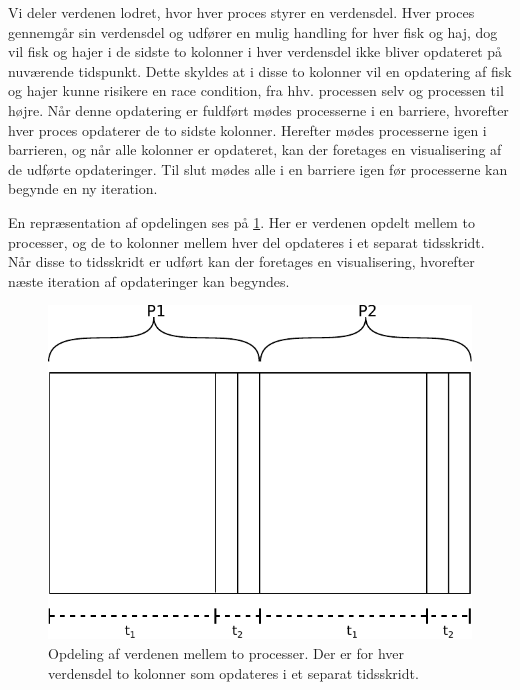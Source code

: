 Vi deler verdenen lodret, hvor hver proces styrer en verdensdel. Hver proces 
gennemgår sin verdensdel og udfører en mulig handling for hver fisk og haj, dog 
vil fisk og hajer i de sidste to kolonner i hver verdensdel ikke bliver 
opdateret på nuværende tidspunkt. Dette skyldes at i disse to kolonner vil en opdatering af fisk og hajer kunne risikere en race condition, fra hhv. processen selv og processen til højre.
 Når denne opdatering er fuldført mødes processerne i en barriere, 
hvorefter hver proces opdaterer de to sidste kolonner. Herefter mødes 
processerne igen i barrieren, og når alle kolonner er opdateret, kan der 
foretages en visualisering af de udførte opdateringer. Til slut mødes alle i en 
barriere igen før processerne kan begynde en ny iteration.

En repræsentation af opdelingen ses på \cref{fig:wator}. Her er verdenen 
opdelt mellem to processer, og de to kolonner mellem hver del opdateres i et 
separat tidsskridt. Når disse to tidsskridt er udført kan der foretages en 
visualisering, hvorefter næste iteration af opdateringer kan begyndes. 
\begin{figure}[hbtp] \begin{center}
  \includegraphics[scale=0.75]{images/wator}
  \caption{Opdeling af verdenen mellem to processer. Der er for hver verdensdel 
  to kolonner som opdateres i et separat tidsskridt.}
  \label{fig:wator}
  \end{center}
\end{figure}

